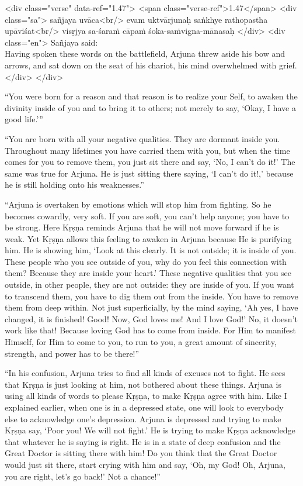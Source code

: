 \begin{html}
<div class="verse" data-ref="1.47">
  <span class="verse-ref">1.47</span>
  <div class="sa">
    sañjaya uvāca<br/>
    evam uktvārjunaḥ saṅkhye rathopastha upāviśat<br/>
    visṛjya sa-śaraṁ cāpaṁ śoka-saṁvigna-mānasaḥ
  </div>
  <div class="en">
    \hspace*{1em}Sañjaya said: \\ Having spoken these words on the battlefield, Arjuna threw aside his bow and arrows, and sat down on the seat of his chariot, his mind overwhelmed with grief.
  </div>
</div>
\end{html}


\enquote{You were born for a reason and that reason is to realize your Self, to awaken the divinity inside of you and to bring it to others; not merely to say, \enquote{Okay, I have a good life.}}

\enquote{You are born with all your negative qualities. They are dormant inside you. Throughout many lifetimes you have carried them with you, but when the time comes for you to remove them, you just sit there and say, \enquote{No, I can’t do it!} The same was true for Arjuna. He is just sitting there saying, \enquote{I can’t do it!,} because he is still holding onto his weaknesses.}

\enquote{Arjuna is overtaken by emotions which will stop him from fighting. So he becomes cowardly, very soft. If you are soft, you can’t help anyone; you have to be strong. Here Kṛṣṇa reminds Arjuna that he will not move forward if he is weak. Yet Kṛṣṇa allows this feeling to awaken in Arjuna because He is purifying him. He is showing him, \enquote{Look at this clearly. It is not outside; it is inside of you. These people who you see outside of you, why do you feel this connection with them? Because they are inside your heart.} These negative qualities that you see outside, in other people, they are not outside: they are inside of you. If you want to transcend them, you have to dig them out from the inside. You have to remove them from deep within. Not just superficially, by the mind saying, \enquote{Ah yes, I have changed, it is finished! Good! Now, God loves me! And I love God!} No, it doesn’t work like that! Because loving God has to come from inside. For Him to manifest Himself, for Him to come to you, to run to you, a great amount of sincerity, strength, and power has to be there!}

\enquote{In his confusion, Arjuna tries to find all kinds of excuses not to fight. He sees that Kṛṣṇa is just looking at him, not bothered about these things. Arjuna is using all kinds of words to please Kṛṣṇa, to make Kṛṣṇa agree with him. Like I explained earlier, when one is in a depressed state, one will look to everybody else to acknowledge one’s depression. Arjuna is depressed and trying to make Kṛṣṇa say, \enquote{Poor you! We will not fight.} He is trying to make Kṛṣṇa acknowledge that whatever he is saying is right. He is in a state of deep confusion and the Great Doctor is sitting there with him! Do you think that the Great Doctor would just sit there, start crying with him and say, \enquote{Oh, my God! Oh, Arjuna, you are right, let’s go back!} Not a chance!}

